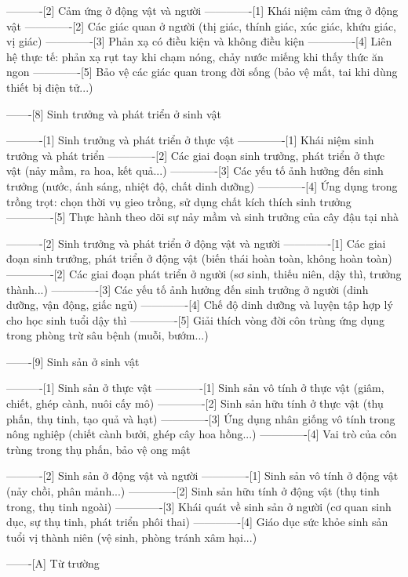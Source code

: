 ----------[2] Cảm ứng ở động vật và người
-------------[1] Khái niệm cảm ứng ở động vật
-------------[2] Các giác quan ở người (thị giác, thính giác, xúc giác, khứu giác, vị giác)
-------------[3] Phản xạ có điều kiện và không điều kiện
-------------[4] Liên hệ thực tế: phản xạ rụt tay khi chạm nóng, chảy nước miếng khi thấy thức ăn ngon
-------------[5] Bảo vệ các giác quan trong đời sống (bảo vệ mắt, tai khi dùng thiết bị điện tử...)

-------[8] Sinh trưởng và phát triển ở sinh vật

----------[1] Sinh trưởng và phát triển ở thực vật
-------------[1] Khái niệm sinh trưởng và phát triển
-------------[2] Các giai đoạn sinh trưởng, phát triển ở thực vật (nảy mầm, ra hoa, kết quả...)
-------------[3] Các yếu tố ảnh hưởng đến sinh trưởng (nước, ánh sáng, nhiệt độ, chất dinh dưỡng)
-------------[4] Ứng dụng trong trồng trọt: chọn thời vụ gieo trồng, sử dụng chất kích thích sinh trưởng
-------------[5] Thực hành theo dõi sự nảy mầm và sinh trưởng của cây đậu tại nhà

----------[2] Sinh trưởng và phát triển ở động vật và người
-------------[1] Các giai đoạn sinh trưởng, phát triển ở động vật (biến thái hoàn toàn, không hoàn toàn)
-------------[2] Các giai đoạn phát triển ở người (sơ sinh, thiếu niên, dậy thì, trưởng thành...)
-------------[3] Các yếu tố ảnh hưởng đến sinh trưởng ở người (dinh dưỡng, vận động, giấc ngủ)
-------------[4] Chế độ dinh dưỡng và luyện tập hợp lý cho học sinh tuổi dậy thì
-------------[5] Giải thích vòng đời côn trùng ứng dụng trong phòng trừ sâu bệnh (muỗi, bướm...)

-------[9] Sinh sản ở sinh vật

----------[1] Sinh sản ở thực vật
-------------[1] Sinh sản vô tính ở thực vật (giâm, chiết, ghép cành, nuôi cấy mô)
-------------[2] Sinh sản hữu tính ở thực vật (thụ phấn, thụ tinh, tạo quả và hạt)
-------------[3] Ứng dụng nhân giống vô tính trong nông nghiệp (chiết cành bưởi, ghép cây hoa hồng...)
-------------[4] Vai trò của côn trùng trong thụ phấn, bảo vệ ong mật

----------[2] Sinh sản ở động vật và người
-------------[1] Sinh sản vô tính ở động vật (nảy chồi, phân mảnh...)
-------------[2] Sinh sản hữu tính ở động vật (thụ tinh trong, thụ tinh ngoài)
-------------[3] Khái quát về sinh sản ở người (cơ quan sinh dục, sự thụ tinh, phát triển phôi thai)
-------------[4] Giáo dục sức khỏe sinh sản tuổi vị thành niên (vệ sinh, phòng tránh xâm hại...)

-------[A] Từ trường

